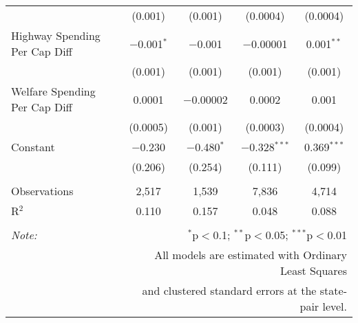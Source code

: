 \begin{table}[!htbp]
\begin{tabular}{@{\extracolsep{5pt}}lcccc}
  & (0.001) & (0.001) & (0.0004) & (0.0004) \\ 
  Highway Spending Per Cap Diff & $-$0.001$^{*}$ & $-$0.001 & $-$0.00001 & 0.001$^{**}$ \\ 
  & (0.001) & (0.001) & (0.001) & (0.001) \\ 
  Welfare Spending Per Cap Diff & 0.0001 & $-$0.00002 & 0.0002 & 0.001 \\ 
  & (0.0005) & (0.001) & (0.0003) & (0.0004) \\ 
  Constant & $-$0.230 & $-$0.480$^{*}$ & $-$0.328$^{***}$ & 0.369$^{***}$ \\ 
  & (0.206) & (0.254) & (0.111) & (0.099) \\ 
 \hline \\[-1.8ex] 
Observations & 2,517 & 1,539 & 7,836 & 4,714 \\ 
R$^{2}$ & 0.110 & 0.157 & 0.048 & 0.088 \\ 
\hline 
\hline \\[-1.8ex] 
\textit{Note:}  & \multicolumn{4}{r}{$^{*}$p$<$0.1; $^{**}$p$<$0.05; $^{***}$p$<$0.01} \\ 
 & \multicolumn{4}{r}{All models are estimated with Ordinary Least Squares} \\ 
 & \multicolumn{4}{r}{and clustered standard errors at the state-pair level.} \\ 
\end{tabular} 
\end{table} 
